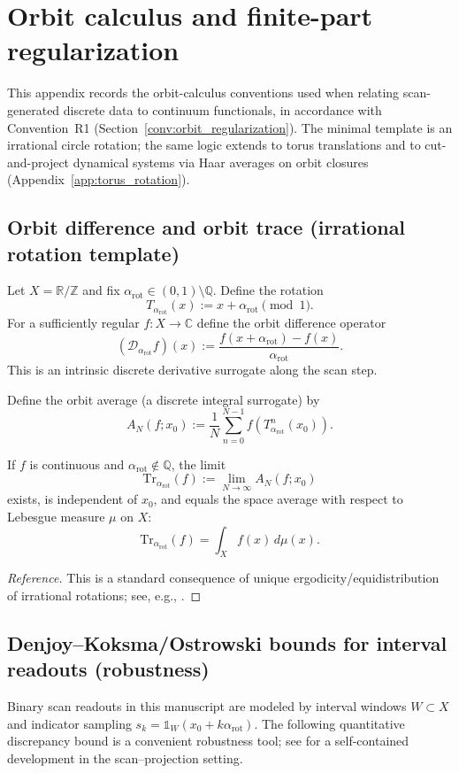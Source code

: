\section{Orbit calculus and finite-part regularization}
\label{app:orbit_calculus}
This appendix records the orbit-calculus conventions used when relating scan-generated discrete data to continuum functionals, in accordance with Convention~R1 (Section~\ref{conv:orbit_regularization}). The minimal template is an irrational circle rotation; the same logic extends to torus translations and to cut-and-project dynamical systems via Haar averages on orbit closures (Appendix~\ref{app:torus_rotation}).

\subsection{Orbit difference and orbit trace (irrational rotation template)}
Let $X=\mathbb{R}/\mathbb{Z}$ and fix $\alpha_{\mathrm{rot}}\in(0,1)\setminus\mathbb{Q}$. Define the rotation
$$
T_{\alpha_{\mathrm{rot}}}(x):=x+\alpha_{\mathrm{rot}}\pmod{1}.
$$
For a sufficiently regular $f:X\to\mathbb{C}$ define the orbit difference operator
$$
(\mathcal{D}_{\alpha_{\mathrm{rot}}} f)(x):=\frac{f(x+\alpha_{\mathrm{rot}})-f(x)}{\alpha_{\mathrm{rot}}}.
$$
This is an intrinsic discrete derivative surrogate along the scan step.\par
Define the orbit average (a discrete integral surrogate) by
$$
A_N(f;x_0):=\frac{1}{N}\sum_{n=0}^{N-1} f(T_{\alpha_{\mathrm{rot}}}^n(x_0)).
$$

\begin{theorem}
If $f$ is continuous and $\alpha_{\mathrm{rot}}\notin\mathbb{Q}$, the limit
$$
\mathrm{Tr}_{\alpha_{\mathrm{rot}}}(f):=\lim_{N\to\infty}A_N(f;x_0)
$$
exists, is independent of $x_0$, and equals the space average with respect to Lebesgue measure $\mu$ on $X$:
$$
\mathrm{Tr}_{\alpha_{\mathrm{rot}}}(f)=\int_X f(x)\,d\mu(x).
$$
\end{theorem}
\begin{proof}[Reference]
This is a standard consequence of unique ergodicity/equidistribution of irrational rotations; see, e.g., \cite{Weyl1916,KuipersNiederreiter1974}.
\end{proof}

\subsection{Denjoy--Koksma/Ostrowski bounds for interval readouts (robustness)}
Binary scan readouts in this manuscript are modeled by interval windows $W\subset X$ and indicator sampling $s_k=\mathds{1}_W(x_0+k\alpha_{\mathrm{rot}})$. The following quantitative discrepancy bound is a convenient robustness tool; see \cite{Ma2025HPA} for a self-contained development in the scan--projection setting.

